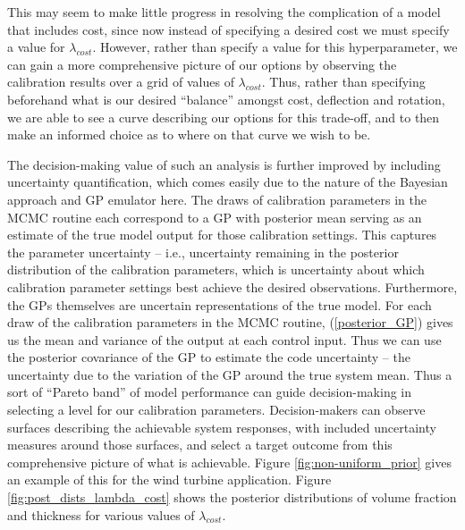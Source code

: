 \documentclass{article}
\begin{document}
This may seem to make little progress in resolving the complication of a model that includes cost, since now instead of specifying a desired cost we must specify a value for $\lambda_{cost}$. However, rather than specify a value for this hyperparameter, we can gain a more comprehensive picture of our options by observing the calibration results over a grid of values of $\lambda_{cost}$. Thus, rather than specifying beforehand what is our desired ``balance'' amongst cost, deflection and rotation, we are able to see a curve describing our options for this trade-off, and to then make an informed choice as to where on that curve we wish to be. 

The decision-making value of such an analysis is further improved by including uncertainty quantification, which comes easily due to the nature of the Bayesian approach and GP emulator here. The draws of calibration parameters in the MCMC routine each correspond to a GP with posterior mean serving as an estimate of the true model output for those calibration settings. This captures the parameter uncertainty -- i.e., uncertainty remaining in the posterior distribution of the calibration parameters, which is uncertainty about which calibration parameter settings best achieve the desired observations. Furthermore, the GPs themselves are uncertain representations of the true model. For each draw of the calibration parameters in the MCMC routine, (\ref{posterior_GP}) gives us the mean and variance of the output at each control input. Thus we can use the posterior covariance of the GP to estimate the code uncertainty -- the uncertainty due to the variation of the GP around the true system mean. Thus a sort of ``Pareto band'' of model performance can guide decision-making in selecting a level for our calibration parameters. Decision-makers can observe surfaces describing the achievable system responses, with included uncertainty measures around those surfaces, and select a target outcome from this comprehensive picture of what is achievable. Figure \ref{fig:non-uniform_prior} gives an example of this for the wind turbine application. Figure \ref{fig:post_dists_lambda_cost} shows the posterior distributions of volume fraction and thickness for various values of $\lambda_{cost}$. 
\end{document}
